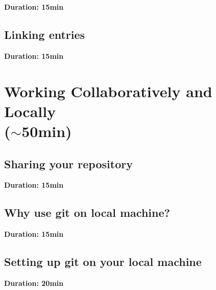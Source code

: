 \documentclass[a4paper, 12pt, oneside]{report} %
\begin{document}
{\bfseries Duration: 15min}




\section{Linking entries}
\label{sec:linking_entries}

{\bfseries Duration: 15min}





\chapter{Working Collaboratively and Locally\\($\sim$50min)}
\label{cha:working_collaboratively_and_locally}

\section{Sharing your repository}
\label{sec:sharing_your_repository}

{\bfseries Duration: 15min}




\section{Why use git on local machine?}
\label{sec:why_use_git_on_local_machine}

{\bfseries Duration: 15min}






\section{Setting up git on your local machine}
\label{sec:setting_up_git_on_your_local_machine}

{\bfseries Duration: 20min}
\end{document}
